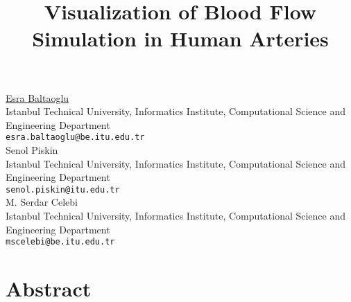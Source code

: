 


\title{Visualization of Blood Flow Simulation in Human Arteries}
\author{} \institute{} %
\maketitle
\begin{center}
{\large \underline{Esra Baltaoglu}}\\
Istanbul Technical University, Informatics Institute, Computational Science and
Engineering Department\\
{\tt esra.baltaoglu@be.itu.edu.tr}\\
\vspace{4mm} %
{\large Senol Piskin}\\
Istanbul Technical University, Informatics Institute, Computational Science and
Engineering Department\\
{\tt senol.piskin@itu.edu.tr}\\
\vspace{4mm} %
{\large M. Serdar Celebi}\\
Istanbul Technical University, Informatics Institute, Computational Science and
Engineering Department\\
{\tt mscelebi@be.itu.edu.tr}

\end{center}

\section*{Abstract}

